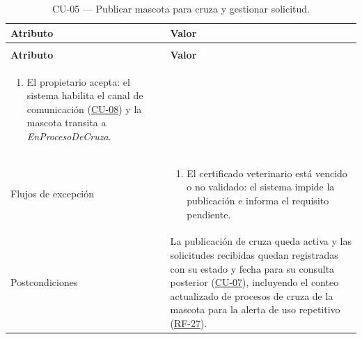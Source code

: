 \documentclass[journal,onecolumn]{IEEEtran}
\makeatletter
\newenvironment{atributos}[2]{%
	\small
	\begin{longtable}{@{}>{\raggedright\arraybackslash}p{4.2cm} >{\raggedright\arraybackslash}p{11.2cm}@{}}
		\caption{#2}\label{tab:#1}\\
		\toprule
		\textbf{Atributo} & \textbf{Valor} \\
		\midrule
		\endfirsthead
		\multicolumn{2}{@{}l}{\small\itshape (continuación)}\\
		\toprule
		\textbf{Atributo} & \textbf{Valor} \\
		\midrule
		\endhead
		\bottomrule
		\endlastfoot
	}{%
	\end{longtable}
	\normalsize
}
\makeatother
\begin{document}
\begin{atributos}{CU-05}{CU-05 --- Publicar mascota para cruza y gestionar solicitud.}
\begin{enumerate}[leftmargin=*, nosep]
			\item[8.1] El propietario acepta: el sistema habilita el canal de comunicación (\hyperref[tab:CU-08]{CU-08}) y la mascota transita a \emph{EnProcesoDeCruza}.
		\end{enumerate} \\
		Flujos de excepción &
		\begin{enumerate}[leftmargin=*, nosep]
			\item[3.1] El certificado veterinario está vencido o no validado: el sistema impide la publicación e informa el requisito pendiente.
		\end{enumerate} \\
		Postcondiciones & La publicación de cruza queda activa y las solicitudes recibidas quedan registradas con su estado y fecha para su consulta posterior (\hyperref[tab:CU-07]{CU-07}), incluyendo el conteo actualizado de procesos de cruza de la mascota para la alerta de uso repetitivo (\hyperref[tab:RF-27]{RF-27}). \\
	\end{atributos}
	
\end{document}
